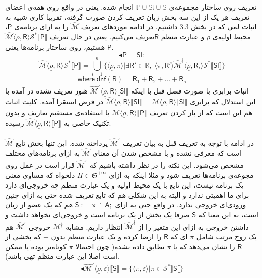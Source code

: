 تعریف روی ساختار مجموعه‌ی 
$\mathbb{P \cup Sl \cup S}$
انجام شده. یعنی در واقع روی همه‌ی اعضای تعریف هر یک از این سه بخش زبان تعریف کردن صورت گرفته، تقریبا کاری شبیه به اثبات لمی که در بخش 3.3 داشتیم.
در ادامه موردهای تعریف $\mathcal{\hat{M}}$ را به ازای برنامه‌ی $\mathsf{P}$، محیط اولیه‌ی $\underline{\rho}$ و عبارت منظم $\mathsf{R}$تعریف می‌کنیم. یعنی در حال تعریف 
$\mathcal{\hat{M}} \langle \underline{\rho} , \mathsf{R} \rangle \mathcal{S}^* 
\llbracket \mathsf{P} \rrbracket$
هستیم، روی ساختار برنامه‌ها یعنی $\mathsf{P}$.
$$\blacktriangleleft \mathsf{P=Sl:}$$
$$\mathcal{\hat{M}} \langle \underline{\rho} , \mathsf{R} \rangle \mathcal{S}^* \llbracket \mathsf{P} \rrbracket=
\bigcup_{i=1}^n \{\langle \underline{\rho} , \pi \rangle | \exists \mathsf{R'} \in \mathbb{R}, \; \langle \pi , \mathsf{R'} \rangle \mathcal{\hat{M}^\nmid}
\langle \underline{\rho}, \mathsf{R}_i \rangle \mathcal{S}^* \llbracket \mathsf{Sl} \rrbracket \}
$$  
$$\mathsf{where\; dnf(R)=R_1 + R_2 + ... + R_n}$$
اثبات برابری با صورت فصل قبل با اینکه 
$\mathcal{\hat{M}^\nmid} \langle \underline{\rho}, \mathsf{R} \rangle \llbracket \mathsf{Sl} \rrbracket$
هنوز تعریف نشده در \cite{calcul} آمده با این استدلال که برابری 
$\mathcal{\hat{M}} \langle \underline{\rho}, \mathsf{R} \rangle \llbracket \mathsf{Sl} \rrbracket=
\mathcal{{M}} \langle \underline{\rho}, \mathsf{R} \rangle \llbracket \mathsf{Sl} \rrbracket$
در فرض استقرا آمده. کلیت اثبات هم این است که از باز کردن تعریف
$\mathcal{{M}} \langle \underline{\rho}, \mathsf{R} \rangle \llbracket \mathsf{P} \rrbracket$
با استفاده‌ی مستقیم تعاریف و بدون تکنیک خاصی به 
$\mathcal{\hat{M}} \langle \underline{\rho}, \mathsf{R} \rangle \llbracket \mathsf{P} \rrbracket$
رسیده.

در ادامه با توجه به تعریف قبل به بیان تعریف 
$\mathcal{\hat{M}^\nmid}$
پرداخته شده. این تنها بخش تابع $\mathcal{\hat{M}}$ است که معرفی نشده و با مشخص شدن آن معنای 
$\mathcal{\hat{M}}$
به ازای برنامه‌های مختلف مشخص می‌شود. این نکته را در نظر داشته باشیم که 
$\mathcal{\hat{M}^\nmid}$
قرار است در عمل روی مجوعه‌ی برنامه‌ها تعریف شود و مثلا اینکه به ازای  
$\Pi \in \mathfrak{S}^{+\infty}$
دلخواه که مساوی معنی یک برنامه نیست، این تابع با یک محیط اولیه و یک عبارت منظم چه خروجی‌ای دارد برای ما اهمیتی ندارد و البته به این شکلی  هم که تابع تعریف شده حتی به ازای چنین ورودی‌ای خروجی ندارد. در واقع حتی به ازای 
$\mathsf{S:=\; x\doteq A;}$
هم که یک عضو از زبان است، به این معنا که $\mathsf{S}$ صرفا یک بخش از یک برنامه است و
 خروجی‌ای نخواهد داشت و داشتن خروجی به ازای این متغیر را از 
$\mathcal{\hat{M}^\nmid}$
انتظار داریم. مشابه 
$\mathcal{M^\nmid}$
خروجی 
$\mathcal{\hat{M}^\nmid}$
هم یک زوج مرتب شامل $\pi$ ای که $\mathsf{R}$ را ارضا کرده و یک عبارت منظم بدون $+$ که بخشی از $\mathsf{R}$ را نشان می‌دهد که با $\pi$ تطابق داده نشده( چون احتمالا $\pi$ کوتاه‌تر بوده یا ممکن است اصلا این عبارت منظم تهی باشد).
$$\blacktriangleleft\mathcal{\hat{M}^\nmid} \langle \underline{\rho}, \mathsf{\varepsilon} \rangle \llbracket \mathsf{S} \rrbracket
=
\{\langle \pi , \varepsilon \rangle | \pi \in \mathcal{S}^* \rrbracket \mathsf{S} \llbracket \}$$

